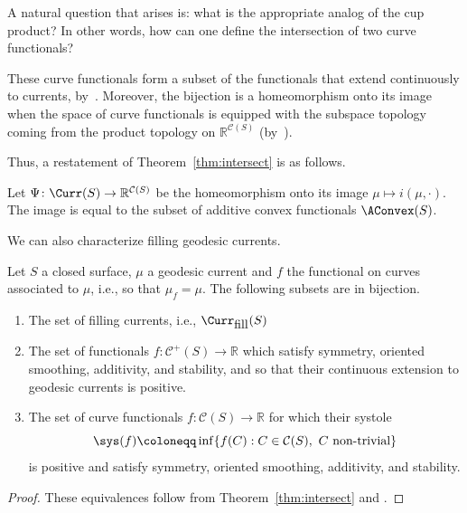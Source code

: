 A natural question that arises is: what is the appropriate analog of the cup product? In other words, how can one define the intersection of two curve functionals?

These curve functionals form a subset of the functionals that extend continuously to currents, by~\cite[Theorem~A]{MGT21:Smoothings}. Moreover, the bijection is a homeomorphism onto its image when the space of curve functionals is equipped with the subspace topology coming from the product topology on $\mathbb{R}^{\mathcal{C}(S)}$ (by~\cite[Theorem~11]{DLR10:DegenerationFlatMetrics}).

Thus, a restatement of Theorem~\ref{thm:intersect} is as follows.

\begin{theorem}
   Let $\Psi \colon \Curr(S) \to \mathbb{R}^{\mathcal{C}(S)}$ be the homeomorphism onto its image $\mu \mapsto i(\mu, \cdot)$.
   The image is equal to the subset of additive convex functionals $\AConvex(S)$.
\end{theorem}

We can also characterize filling geodesic currents.

\begin{corollary}
  Let $S$ a closed surface,
  $\mu$ a geodesic current and $f$ the functional on curves associated
  to $\mu$, i.e., so that $\mu_f=\mu$. The following subsets are in
  bijection.

\begin{enumerate}
    \item The set of filling currents, i.e., $ \Curr_{\mbox{fill}}(S)$
    \item The set of functionals $f \colon \mathcal{C}^+(S) \to
      \mathbb{R}$ which satisfy symmetry, oriented smoothing,
      additivity, and stability, and so that their continuous extension to geodesic currents is positive.
    \item The set of curve functionals $f \colon \mathcal{C}(S) \to
      \mathbb{R}$ for which their systole \[\sys(f)\coloneqq \inf \{
        f(C) : C \in \mathcal{C}(S),\ C \mbox{ non-trivial} \}\] is
      positive and satisfy symmetry, oriented smoothing, additivity,
      and stability.
\end{enumerate}
\end{corollary}
\begin{proof}
These equivalences follow from Theorem~\ref{thm:intersect} and \cite[Theorem~1.3]{BIPP21:Systoles}.
\end{proof}

